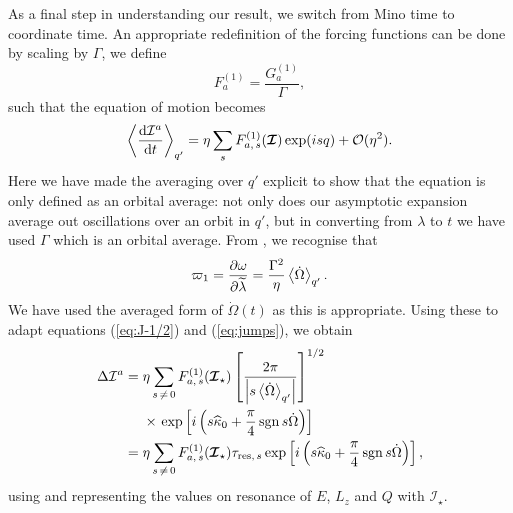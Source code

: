 As a final step in understanding our result, we switch from Mino time to coordinate time. An appropriate redefinition of the forcing functions can be done by scaling by $\Gamma$, we define
\begin{equation}
F_a^{(1)} = \dfrac{G_a^{(1)}}{\Gamma},
\end{equation}
such that the equation of motion becomes
\begin{equation}
\left\langle \dfrac{\mathrm{d} {\mathcal{I}^a}}{\mathrm{d} {t}}\right\rangle_{q'} =  \eta\sum_s F_{a,\,s}^{(1)}(\boldsymbol{\mathcal{I}})\exp(is q) + \mathcal{O}({\eta^2}).
\end{equation}
Here we have made the averaging over $q'$ explicit to show that the equation is only defined as an orbital average: not only does our asymptotic expansion average out oscillations over an orbit in $q'$, but in converting from $\lambda$ to $t$ we have used $\Gamma$ which is an orbital average.
From , we recognise that
\begin{equation}
\varpi_1 = \dfrac{\partial {\omega}}{\partial {\widetilde{\lambda}}} = \dfrac{\Gamma^2}{\eta}\left\langle\dot{\Omega}\right\rangle_{q'}.
\end{equation}
We have used the averaged form of $\dot{\Omega}(t)$ as this is appropriate. Using these to adapt equations (\ref{eq:J-1/2}) and (\ref{eq:jumps}), we obtain
\begin{align}
\Delta \mathcal{I}^a = {} & \eta\sum_{s\,\neq\,0}F_{a,\,s}^{(1)}(\boldsymbol{\mathcal{I}}_\star)\left[\dfrac{2\pi}{\left|s \left\langle\dot{\Omega}\right\rangle_{q'}\right|}\right]^{1/2} \nonumber \\*
 {} & \times \left.\exp\left[i\left(s \widehat{\kappa}_0 + \dfrac{\pi}{4}\operatorname{sgn} s\dot{\Omega}\right)\right]\right. \\
 = {} & \eta\sum_{s\,\neq\,0}F_{a,\,s}^{(1)}(\boldsymbol{\mathcal{I}}_\star)\tau_{\mathrm{res},\,s}\exp\left[i\left(s \widehat{\kappa}_0 + \dfrac{\pi}{4} \operatorname{sgn} s\dot{\Omega} \right)\right],
\end{align}
using  and representing the values on resonance of $E$, $L_z$ and $Q$ with $\boldsymbol{\mathcal{I}}_\star$.
